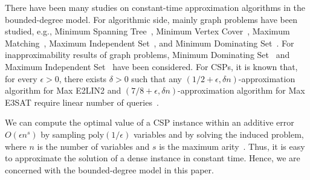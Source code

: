 \documentclass[letterpaper, 11pt]{article}
\newcommand{\poly}{\mathrm{poly}}
\begin{document}
There have been many studies on constant-time approximation algorithms in the bounded-degree model.
For algorithmic side,
mainly graph problems have been studied,
e.g., \textsf{Minimum Spanning Tree}~\cite{CRT01},
\textsf{Minimum Vertex Cover}~\cite{NO08,PR07,YYI09}, 
\textsf{Maximum Matching}~\cite{NO08,YYI09}, 
\textsf{Maximum Independent Set}~\cite{Alo10},
and \textsf{Minimum Dominating Set}~\cite{NO08,YYI09}.
For inapproximability results of graph problems,
\textsf{Minimum Dominating Set}~\cite{Alo10} and \textsf{Maximum Independent Set}~\cite{Alo10,Yos10} have been considered.
For CSPs,
it is known that, for every $\epsilon>0$, 
there exists $\delta>0$ such that any $(1/2+\epsilon,\delta n)$-approximation algorithm for \textsf{Max E2LIN2} and $(7/8+\epsilon,\delta n)$-approximation algorithm for \textsf{Max E3SAT} require linear number of queries~\cite{BOT02}.

We can compute the optimal value of a CSP instance within an additive error $O(\epsilon n^s)$ by sampling $\poly(1/\epsilon)$ variables and by solving the induced problem,
where $n$ is the number of variables and $s$ is the maximum arity~\cite{AdlVKK03,AE02}.
Thus, it is easy to approximate the solution of a dense instance in constant time.
Hence, we are concerned with the bounded-degree model in this paper.

\vspace{-10pt}
\end{document}
